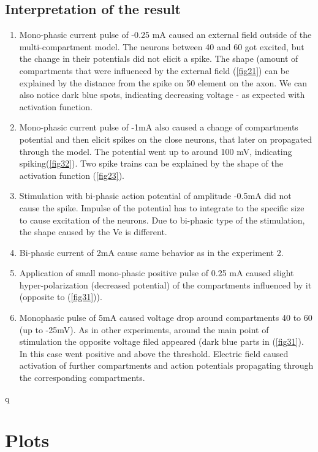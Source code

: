 \documentclass{scrartcl}			%
\begin{document}
\subsection{Interpretation of the result}
\begin{enumerate}
\item Mono-phasic current pulse of -0.25 mA caused an external field outside of the multi-compartment model. The neurons between 40 and 60 got excited, but the change in their potentials did not elicit a spike. The shape (amount of compartments that were influenced by the external field (\ref{fig21}) can be explained by the distance from the spike on 50 element on the axon. We can also notice dark blue spots, indicating decreasing voltage - as expected with activation function.
\item Mono-phasic current pulse of -1mA also caused a change of compartments potential and then elicit spikes on the close neurons, that later on propagated through the model. The potential went up to around 100 mV, indicating spiking(\ref{fig32}). Two spike trains can be explained by the shape of the activation function (\ref{fig23}).
\item Stimulation with bi-phasic action potential of amplitude -0.5mA did not cause the spike. Impulse of the potential has to integrate to the specific size to cause excitation of the neurons. Due to bi-phasic type of the stimulation, the shape caused by the Ve is different.
\item Bi-phasic current of 2mA cause same behavior as in the experiment 2.
\item Application of small mono-phasic positive pulse of 0.25 mA caused slight hyper-polarization (decreased potential) of the compartments influenced by it (opposite to (\ref{fig31})).
\item Monophasic pulse of 5mA caused voltage drop around compartments 40 to 60 (up to -25mV). 
As in other experiments, around the main point of stimulation the opposite voltage filed appeared (dark blue parts in (\ref{fig31}). In this case went positive and above the threshold. Electric field caused activation of further compartments and action potentials propagating through the corresponding compartments.
\end{enumerate}q
\newpage
\section{Plots}
\end{document}
